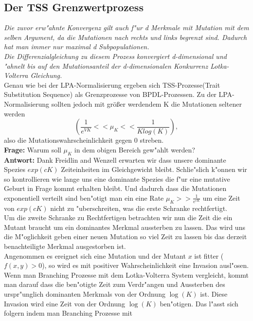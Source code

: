 \documentclass[11pt, a4paper, german]{article}
\begin{document}
	\subsection{Der TSS Grenzwertprozess}
	\textit{Die zuvor erw"ahnte Konvergenz  gilt auch f"ur d Merkmale mit Mutation mit dem selben Argument, da die Mutationen nach rechts und links begrenzt sind. Dadurch hat man immer nur maximal d Subpopulationen.\\
	Die Differenzialgleichung zu diesem Prozess konvergiert d-dimensional und "ahnelt bis auf den Mutationsanteil der d-dimensionalen Konkurrenz Lotka-Volterra Gleichung.}\\
	Genau wie bei der LPA-Normalisierung ergeben sich TSS-Prozesse(Trait Substitution Sequence) als Grenzprozesse von BPDL-Prozessen. Zu der LPA-Normalisierung sollten jedoch mit größer werdendem K die Mutationen seltener werden 
	\[ \left( \frac{1}{e^{VK}} << \mu_K << \frac{1}{K log(K)} \right), \] 
	also die Mutationswahrscheinlichkeit gegen 0 streben.\\ 
	\textbf{Frage:} Warum soll $ \mu_K $ in dem obigen Bereich gew"ahlt werden?\\
	\textbf{Antwort:} Dank Freidlin and Wenzell \cite{freidlin2012random} erwarten wir dass unsere dominante Spezies $ exp(cK) $ Zeiteinheiten im Gleichgewicht bleibt. Schlie"slich k"onnen wir so kontrollieren wie lange uns eine dominante Spezies die f"ur eine mutative Geburt in Frage kommt erhalten bleibt. Und dadurch dass die Mutationen exponentiell verteilt sind ben"otigt man ein eine Rate $ \mu_K >> \frac{1}{e^{cK}} $ um eine Zeit von $ exp(cK) $ nicht zu "uberschreiten, was die erste Schranke rechtfertigt.\\
	Um die zweite Schranke zu Rechtfertigen betrachten wir nun die Zeit die ein Mutant braucht um ein dominantes Merkmal aussterben zu lassen. Das wird uns die M"oglichkeit geben einer neuen Mutation so viel Zeit zu lassen bis das derzeit benachteiligte Merkmal ausgestorben ist.\\
	Angenommen es ereignet sich eine Mutation und der Mutant $ x $ ist fitter ($ f(x,y) > 0 $), so wird es mit positiver Wahrscheinlichkeit eine Invasion ausl"osen. Wenn man Branching Prozesse mit dem Lotka-Volterra System vergleicht, kommt man darauf dass die ben"otigte Zeit zum Verdr"angen und Aussterben des urspr"unglich dominanten Merkmals von der Ordnung $ \log(K) $ ist.
	Diese Invasion wird eine Zeit von der Ordnung $ \log(K) $ ben"otigen. Das l"asst sich folgern indem man Branching Prozesse mit 
	
\end{document}
